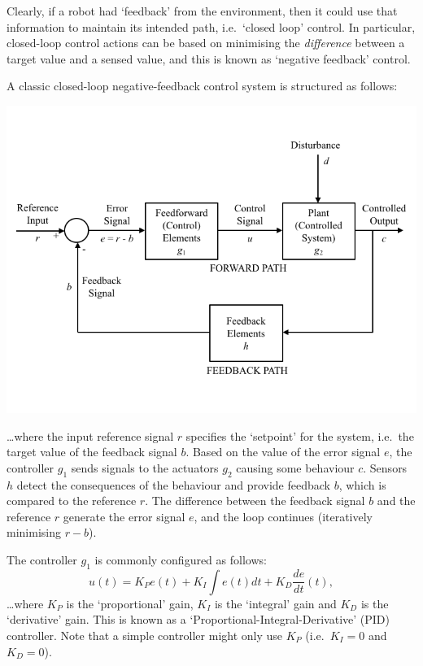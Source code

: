 \documentclass[hidelinks,a4paper,11pt]{article}
\begin{document}
Clearly, if a robot had `feedback' from the environment, then it could use that information to maintain its intended path, i.e.\ `closed loop' control.  In particular, closed-loop control actions can be based on minimising the \emph{difference} between a target value and a sensed value, and this is known as `negative feedback' control.

A classic closed-loop negative-feedback control system is structured as follows:
\begin{center}
	\includegraphics[width=\textwidth]{ClassicControlSystem.png}
\end{center}

\ldots where the input reference signal $r$ specifies the `setpoint' for the system, i.e.\ the target value of the feedback signal $b$.  Based on the value of the error signal $e$, the controller $g_1$ sends signals to the actuators $g_2$ causing some behaviour $c$.  Sensors $h$ detect the consequences of the behaviour and provide feedback $b$, which is compared to the reference $r$.  The difference between the feedback signal $b$ and the reference $r$ generate the error signal $e$, and the loop continues (iteratively minimising $r-b$).

The controller $g_1$ is commonly configured as follows:
$$u(t) = K_P e(t) + K_I \int e(t)dt + K_D \frac{de}{dt}(t) ,$$
\ldots where $K{_P}$ is the `proportional' gain, $K_I$ is the `integral' gain and $K_D$ is the `derivative' gain.  This is known as a `Proportional-Integral-Derivative' (PID) controller.  Note that a simple controller might only use $K_P$ (i.e.\ $K_I=0$ and $K_D=0$).
\end{document}
